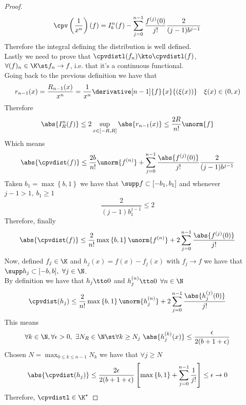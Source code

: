 \documentclass[../mmf.tex]{subfiles}
\begin{document}
\begin{proof}
	\begin{equation*}
		\cpv\left( \frac{1}{x^n} \right)(f)=I_b^n(f)-\sum_{j=0}^{n-1}\frac{f^{(j)}(0)}{j!}\frac{2}{(j-1)b^{j-1}}
	\end{equation*}
	Therefore the integral defining the distribution is well defined.\\
	Lastly we need to prove that $\cpvdistl(f_n)\kto\cpvdistl(f)$, $\forall(f)_n\in\K\st f_n\to f$, i.e. that it's a continuous functional.\\
	Going back to the previous definition we have that
	\begin{equation*}
		r_{n-1}(x)=\frac{R_{n-1}(x)}{x^n}=\frac{1}{x^n}\derivative[n-1]{f}{x}{(\xi(x))}\quad\xi(x)\in(0,x)
	\end{equation*}
	Therefore
	\begin{equation*}
		\abs{I^n_R(f)}\le2\sup_{x\in[-R,R]}\abs{r_{n-1}(x)}\le\frac{2R}{n!}\unorm{f}
	\end{equation*}
	Which means
	\begin{equation*}
		\abs{\cpvdist(f)}\le\frac{2b}{n!}\unorm{f^{(n)}}+\sum_{j=0}^{n-1}\frac{\abs{f^{(j)}(0)}}{j!}\frac{2}{(j-1)b^{j-1}}
	\end{equation*}
	Taken $b_1=\max\left\{ b,1 \right\}$ we have that $\supp f\subset[-b_1,b_1]$ and whenever $j-1>1,\ b_1\ge1$
	\begin{equation*}
		\frac{2}{(j-1)b_1^{j-1}}\le2
	\end{equation*}
	Therefore, finally
	\begin{equation*}
		\abs{\cpvdist(f)}\le\frac{2}{n!}\max\left\{ b,1 \right\}\unorm{f^{(n)}}+2\sum_{j=0}^{n-1}\frac{\abs{f^{(j)}(0)}}{j!}
	\end{equation*}
	Now, defined $f_j\in\K$ and $h_j(x)=f(x)-f_j(x)$ with $f_j\to f$ we have that $\supp h_j\subset[-b,b],\ \forall j\in\N$.\\
	By definition we have that $h_j\tto0$ and $h^{(n)}_j\tto0$ $\forall n\in\N$
	\begin{equation*}
		\cpvdist(h_j)\le\frac{2}{n!}\max\left\{ b,1 \right\}\unorm{h_j^{(n)}}+2\sum_{j=0}^{n-1}\frac{\abs{h_j^{(j)}(0)}}{j!}
	\end{equation*}
	This means
	\begin{equation*}
		\forall k\in\N,\forall\epsilon>0,\ \exists N_R\in\N\st\forall k\ge N_j\ \abs{h_j^{(k)}(x)}\le\frac{\epsilon}{2(b+1+\epsilon)}
	\end{equation*}
	Chosen $N=\max_{0\le k\le n-1}N_k$ we have that $\forall j\ge N$
	\begin{equation*}
		\abs{\cpvdist(h_j)}\le\frac{2\epsilon}{2(b+1+\epsilon)}\left[ \max\left\{ b,1 \right\}+\sum_{j=0}^{n-1}\frac{1}{j!} \right]\le\epsilon\to0
	\end{equation*}
	Therefore, $\cpvdistl\in\K^\star$
\end{proof}
\end{document}
